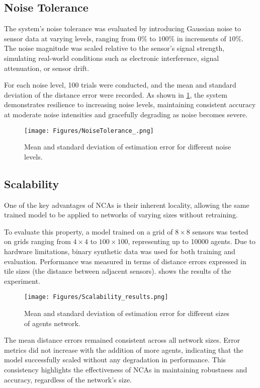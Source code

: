\subsection{Noise Tolerance}

The system's noise tolerance was evaluated by introducing Gaussian noise to sensor data at varying levels, ranging from $0\%$ to $100\%$ in increments of $10\%$. The noise magnitude was scaled relative to the sensor's signal strength, simulating real-world conditions such as electronic interference, signal attenuation, or sensor drift. 



For each noise level, 100 trials were conducted, and the mean and standard deviation of the distance error were recorded. As shown in \cref{fig:noise}, the system demonstrates resilience to increasing noise levels, maintaining consistent accuracy at moderate noise intensities and gracefully degrading as noise becomes severe. 

\begin{figure}[t]
\centerline{\texttt{[image: Figures/NoiseTolerance\_.png]}}
\caption{Mean and standard deviation of estimation error for different noise levels.}
\label{fig:noise}
\end{figure}



\subsection{Scalability}

One of the key advantages of \acp{NCA} is their inherent locality, allowing the same trained model to be applied to networks of varying sizes without retraining. 

To evaluate this property, a model trained on a grid of $8\times8$ sensors was tested on grids ranging from $4 \times 4$ to $100 \times 100$, representing up to 10000 agents. 
Due to hardware limitations, binary synthetic data was used for both training and evaluation. 
Performance was measured in terms of distance errors expressed in tile sizes (the distance between adjacent sensors).  shows the results of the experiment.

\begin{figure}[t]
\centerline{\texttt{[image: Figures/Scalability\_results.png]}}
\caption{Mean and standard deviation of estimation error for different sizes of agents network.}
\label{fig:scale}
\end{figure}

The mean distance errors remained consistent across all network sizes. Error metrics did not increase with the addition of more agents, indicating that the model successfully scaled without any degradation in performance. This consistency highlights the effectiveness of \acp{NCA} in maintaining robustness and accuracy, regardless of the network's size.





